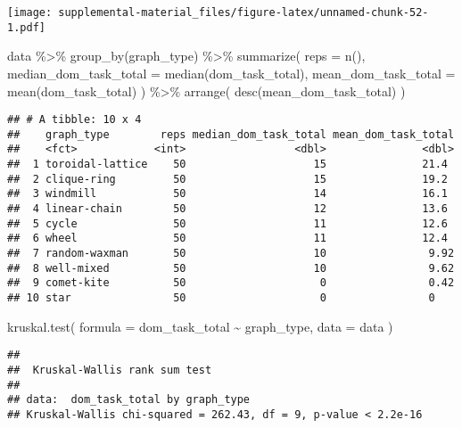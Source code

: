 \documentclass[
]{book}
\newenvironment{Shaded}{\begin{snugshade}}{\end{snugshade}}
\newcommand{\AttributeTok}[1]{\textcolor[rgb]{0.77,0.63,0.00}{#1}}
\newcommand{\FunctionTok}[1]{\textcolor[rgb]{0.00,0.00,0.00}{#1}}
\newcommand{\NormalTok}[1]{#1}
\newcommand{\SpecialCharTok}[1]{\textcolor[rgb]{0.00,0.00,0.00}{#1}}
\begin{document}
\texttt{[image: supplemental-material\_files/figure-latex/unnamed-chunk-52-1.pdf]}

\begin{Shaded}
\begin{Highlighting}[]
\NormalTok{data }\SpecialCharTok{\%\textgreater{}\%}
  \FunctionTok{group\_by}\NormalTok{(graph\_type) }\SpecialCharTok{\%\textgreater{}\%}
  \FunctionTok{summarize}\NormalTok{(}
    \AttributeTok{reps =} \FunctionTok{n}\NormalTok{(),}
    \AttributeTok{median\_dom\_task\_total =} \FunctionTok{median}\NormalTok{(dom\_task\_total),}
    \AttributeTok{mean\_dom\_task\_total =} \FunctionTok{mean}\NormalTok{(dom\_task\_total)}
\NormalTok{  ) }\SpecialCharTok{\%\textgreater{}\%}
  \FunctionTok{arrange}\NormalTok{(}
    \FunctionTok{desc}\NormalTok{(mean\_dom\_task\_total)}
\NormalTok{  )}
\end{Highlighting}
\end{Shaded}

\begin{verbatim}
## # A tibble: 10 x 4
##    graph_type        reps median_dom_task_total mean_dom_task_total
##    <fct>            <int>                 <dbl>               <dbl>
##  1 toroidal-lattice    50                    15               21.4 
##  2 clique-ring         50                    15               19.2 
##  3 windmill            50                    14               16.1 
##  4 linear-chain        50                    12               13.6 
##  5 cycle               50                    11               12.6 
##  6 wheel               50                    11               12.4 
##  7 random-waxman       50                    10                9.92
##  8 well-mixed          50                    10                9.62
##  9 comet-kite          50                     0                0.42
## 10 star                50                     0                0
\end{verbatim}

\begin{Shaded}
\begin{Highlighting}[]
\FunctionTok{kruskal.test}\NormalTok{(}
  \AttributeTok{formula =}\NormalTok{ dom\_task\_total }\SpecialCharTok{\textasciitilde{}}\NormalTok{ graph\_type,}
  \AttributeTok{data =}\NormalTok{ data}
\NormalTok{)}
\end{Highlighting}
\end{Shaded}

\begin{verbatim}
## 
##  Kruskal-Wallis rank sum test
## 
## data:  dom_task_total by graph_type
## Kruskal-Wallis chi-squared = 262.43, df = 9, p-value < 2.2e-16
\end{verbatim}
\end{document}

